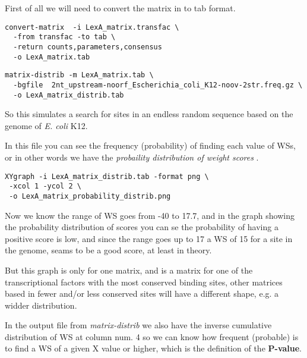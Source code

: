 First of all we will need to convert the matrix in to tab format.

{\color{Blue} 
\begin{footnotesize} 
\begin{verbatim}
convert-matrix  -i LexA_matrix.transfac \
  -from transfac -to tab \
  -return counts,parameters,consensus 
  -o LexA_matrix.tab
\end{verbatim} 
\end{footnotesize}
}


{\color{Blue} 
\begin{footnotesize}
\begin{verbatim}
matrix-distrib -m LexA_matrix.tab \
  -bgfile  2nt_upstream-noorf_Escherichia_coli_K12-noov-2str.freq.gz \
  -o LexA_matrix_distrib.tab
\end{verbatim} 
\end{footnotesize} 
}

So this simulates a search for sites in an endless random sequence
based on the genome of \textit{E. coli} K12.

In this file you can see the frequency (probability) of finding each
value of WSs, or in other words we have the \textit{ probaility
  distribution of weight scores }.

{\color{Blue} 
\begin{footnotesize}
\begin{verbatim}
XYgraph -i LexA_matrix_distrib.tab -format png \
 -xcol 1 -ycol 2 \
 -o LexA_matrix_probability_distrib.png
\end{verbatim} 
\end{footnotesize} }

Now we know the range of WS goes from -40 to 17.7, and in the graph
showing the probability distribution of scores you can se the
probability of having a positive score is low, and since the range
goes up to 17 a WS of 15 for a site in the genome, seams to be a good
score, at least in theory.

But this graph is only for one matrix, and is a matrix for one of the
transcriptional factors with the most conserved binding sites, other
matrices based in fewer and/or less conserved sites will have a
different shape, e.g. a widder distribution.

In the output file from \textit{matrix-distrib} we also have the
inverse cumulative distribution of WS at column num. 4 so we can know
how frequent (probable) is to find a WS of a given X value or higher,
which is the definition of the \textbf{P-value}.

